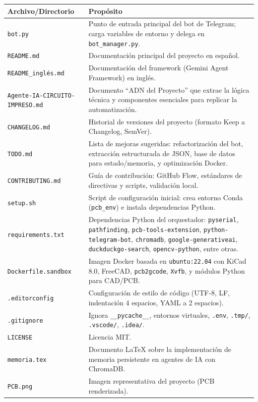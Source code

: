 \documentclass[12pt, a4paper]{article}
\begin{document}
\begin{longtable}{|p{4cm}|p{10cm}|}
\hline
\textbf{Archivo/Directorio} & \textbf{Propósito} \\
\hline
\endhead
\texttt{bot.py} & Punto de entrada principal del bot de Telegram; carga variables de entorno y delega en \texttt{bot\_manager.py}. \\
\hline
\texttt{README.md} & Documentación principal del proyecto en español. \\
\hline
\texttt{README\_inglés.md} & Documentación del framework (Gemini Agent Framework) en inglés. \\
\hline
\texttt{Agente-IA-}\allowbreak\texttt{CIRCUITO-}\allowbreak\texttt{IMPRESO.md} & Documento ``ADN del Proyecto'' que extrae la lógica técnica y componentes esenciales para replicar la automatización. \\
\hline
\texttt{CHANGELOG.md} & Historial de versiones del proyecto (formato Keep a Changelog, SemVer). \\
\hline
\texttt{TODO.md} & Lista de mejoras sugeridas: refactorización del bot, extracción estructurada de JSON, base de datos para estado/memoria, y optimización Docker. \\
\hline
\texttt{CONTRIBUTING.md} & Guía de contribución: GitHub Flow, estándares de directivas y scripts, validación local. \\
\hline
\texttt{setup.sh} & Script de configuración inicial: crea entorno Conda (\texttt{pcb\_env}) e instala dependencias Python. \\
\hline
\texttt{requirements.txt} & Dependencias Python del orquestador: \texttt{pyserial}, \texttt{pathfinding}, \texttt{pcb-tools-extension}, \texttt{python-telegram-bot}, \texttt{chromadb}, \texttt{google-generativeai}, \texttt{duckduckgo-search}, \texttt{opencv-python}, entre otras. \\
\hline
\texttt{Dockerfile.sandbox} & Imagen Docker basada en \texttt{ubuntu:22.04} con KiCad 8.0, FreeCAD, \texttt{pcb2gcode}, \texttt{Xvfb}, y módulos Python para CAD/PCB. \\
\hline
\texttt{.editorconfig} & Configuración de estilo de código (UTF-8, LF, indentación 4 espacios, YAML a 2 espacios). \\
\hline
\texttt{.gitignore} & Ignora \texttt{\_\_pycache\_\_}, entornos virtuales, \texttt{.env}, \texttt{.tmp/}, \texttt{.vscode/}, \texttt{.idea/}. \\
\hline
\texttt{LICENSE} & Licencia MIT. \\
\hline
\texttt{memoria.tex} & Documento LaTeX sobre la implementación de memoria persistente en agentes de IA con ChromaDB. \\
\hline
\texttt{PCB.png} & Imagen representativa del proyecto (PCB renderizada). \\
\hline
\end{longtable}
\end{document}
